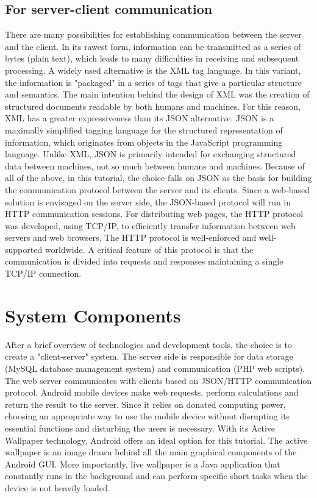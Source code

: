 \subsection{For server-client communication}

There are many possibilities for establishing communication between the server and the client. In its rawest form, information can be transmitted as a series of bytes (plain text), which leads to many difficulties in receiving and subsequent processing. A widely used alternative is the XML tag language. In this variant, the information is "packaged" in a series of tags that give a particular structure and semantics. The main intention behind the design of XML was the creation of structured documents readable by both humans and machines. For this reason, XML has a greater expressiveness than its JSON alternative. JSON is a maximally simplified tagging language for the structured representation of information, which originates from objects in the JavaScript programming language. Unlike XML, JSON is primarily intended for exchanging structured data between machines, not so much between humans and machines. Because of all of the above, in this tutorial, the choice falls on JSON as the basis for building the communication protocol between the server and its clients. Since a web-based solution is envisaged on the server side, the JSON-based protocol will run in HTTP communication sessions. For distributing web pages, the HTTP protocol was developed, using TCP/IP, to efficiently transfer information between web servers and web browsers. The HTTP protocol is well-enforced and well-supported worldwide. A critical feature of this protocol is that the communication is divided into requests and responses maintaining a single TCP/IP connection.

\section{System Components}

After a brief overview of technologies and development tools, the choice is to create a "client-server" system. The server side is responsible for data storage (MySQL database management system) and communication (PHP web scripts). The web server communicates with clients based on JSON/HTTP communication protocol. Android mobile devices make web requests, perform calculations and return the result to the server. Since it relies on donated computing power, choosing an appropriate way to use the mobile device without disrupting its essential functions and disturbing the users is necessary. With its Active Wallpaper technology, Android offers an ideal option for this tutorial. The active wallpaper is an image drawn behind all the main graphical components of the Android GUI. More importantly, live wallpaper is a Java application that constantly runs in the background and can perform specific short tasks when the device is not heavily loaded.

